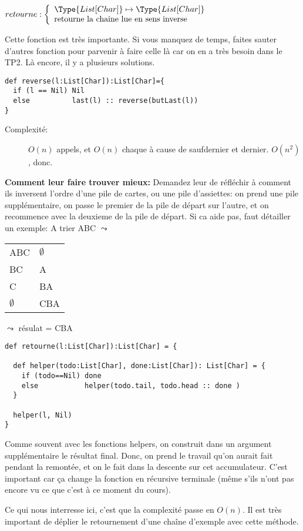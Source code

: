 \documentclass[10pt]{article}\usepackage[correction,nu]{esial}
\begin{document}
\begin{Question}
  $retourne: \left\{
    \begin{array}{l}
      \Type{List[Char]}\mapsto \Type{List[Char]}\\
      \text{retourne la chaine lue en sens inverse}
    \end{array}\right.$  
\end{Question}
\begin{Reponse}
  Cette fonction est très importante. Si vous manquez de temps, faites sauter
  d'autres fonction pour parvenir à faire celle là car on en a très besoin dans
  le TP2. Là encore, il y a plusieurs solutions.
  \begin{Verbatim}[label=version bourinne]
def reverse(l:List[Char]):List[Char]={
  if (l == Nil) Nil
  else          last(l) :: reverse(butLast(l))
}
  \end{Verbatim}
  \begin{description}
  \item[Complexité:] $O(n)$ appels, et $O(n)$ chaque à cause de saufdernier et
    dernier. $O(n^2)$, donc.
  \end{description}
  
  \textbf{Comment leur faire trouver mieux:} Demandez leur de réfléchir à
  comment ils inversent l'ordre d'une pile de cartes, ou une pile d'assiettes: on prend une pile 
  supplémentaire, on passe le premier de la pile de départ sur l'autre, et on
  recommence avec la deuxieme de la pile de départ. Si ca aide pas, faut
  détailler un exemple:
  A trier ABC $\leadsto$ \begin{tabular}{|l l|}\hline
    ABC&$\emptyset$\\
    BC&A\\
    C&BA\\
    $\emptyset$&CBA\\\hline
  \end{tabular}$\leadsto$ résulat = CBA

  \begin{Verbatim}[label=avec helper]
def retourne(l:List[Char]):List[Char] = {

  def helper(todo:List[Char], done:List[Char]): List[Char] = {
    if (todo==Nil) done
    else           helper(todo.tail, todo.head :: done )
  }

  helper(l, Nil)
}
  \end{Verbatim}
  Comme souvent avec les fonctions helpers, on construit dans un argument
  supplémentaire le résultat final. Donc, on prend le travail qu'on aurait fait
  pendant la remontée, et on le fait dans la descente sur cet
  accumulateur. C'est important car ça change la fonction en récursive
  terminale (même s'ils n'ont pas encore vu ce que c'est à ce moment du cours).

  Ce qui nous interresse ici, c'est que la complexité passe en $O(n)$. Il est
  très important de déplier le retournement d'une chaîne d'exemple avec cette
  méthode. 

\end{Reponse}
\end{document}
